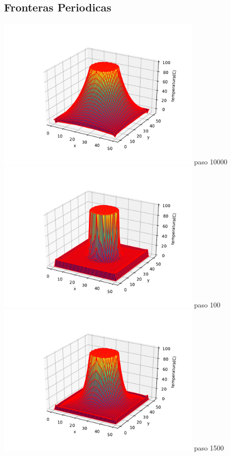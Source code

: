 \documentclass[12pt]{article}
\begin{document}
\begin{centering}
\subsection{Fronteras Periodicas}
\includegraphics[width=0.75\textwidth]{3d8.pdf}
paso 10000
\\
\includegraphics[width=0.75\textwidth]{3d9.pdf}
paso 100
\\
\includegraphics[width=0.75\textwidth]{3d10.pdf}
paso 1500


\end{centering}
\end{document}
